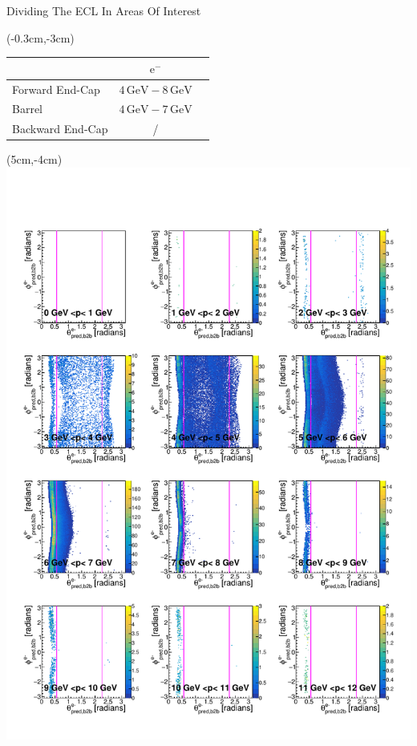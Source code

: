 \documentclass[8pt]{beamer}
\begin{document}
\begin{frame}{Dividing The ECL In Areas Of Interest}
	\begin{textblock*}{5cm}(-0.3cm,-3cm)
	\begin{table}[h!]
		\centering
		\begin{tabular}{lcc}
			&$\textrm{e}^-$&\\
			\hline
			Forward End-Cap &$4\,\textrm{GeV} - 8\,\textrm{GeV}$&\\
			Barrel &$4\,\textrm{GeV} - 7\,\textrm{GeV}$&\\
			Backward End-Cap & /&\\	
		\end{tabular}

	\end{table}
	
	
\end{textblock*}
	
	
	\begin{textblock*}{6.5cm}(5cm,-4cm)
		\includegraphics[width=\textwidth]{VBilder/RTPMemD_MC}
	\end{textblock*}
	

\end{frame}
\end{document}

